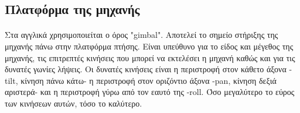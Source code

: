 \documentclass[a4paper, 12pt, twoside]{report}
\begin{document}
{{{{{{		\subsection{Πλατφόρμα της μηχανής}
			\paragraph{}{Στα αγγλικά χρησιμοποιείται ο όρος "gimbal". Αποτελεί το σημείο στήριξης της μηχανής πάνω στην πλατφόρμα πτήσης. Είναι υπεύθυνο για το είδος και μέγεθος της μηχανής, τις επιτρεπτές κινήσεις που μπορεί να εκτελέσει η μηχανή καθώς και για τις δυνατές γωνίες λήψεις. Οι δυνατές κινήσεις είναι η περιστροφή στον κάθετο άξονα -tilt, κίνηση πάνω κάτω- η περιστροφή στον οριζόντιο άξονα -pan, κίνηση δεξιά αριστερά- και η περιστροφή γύρω από τον εαυτό της -roll. Όσο μεγαλύτερο το εύρος των κινήσεων αυτών, τόσο το καλύτερο.
			}
			
			\begin{landscape}	
			\setlength\LTleft{0pt}            %
			\setlength\LTright{0pt}           %
	

\end{landscape}}}}}}}
\end{document}
